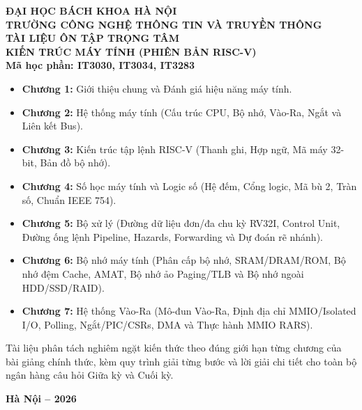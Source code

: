\documentclass[12pt,a4paper]{report}
\begin{document}
\begin{titlepage}
    \begin{center}
        \textbf{\large ĐẠI HỌC BÁCH KHOA HÀ NỘI}\\
        \textbf{\large TRƯỜNG CÔNG NGHỆ THÔNG TIN VÀ TRUYỀN THÔNG}\\[2.5cm]
        
        {\Huge \textbf{TÀI LIỆU ÔN TẬP TRỌNG TÂM}}\\[0.5cm]
        {\LARGE \textbf{KIẾN TRÚC MÁY TÍNH (PHIÊN BẢN RISC-V)}}\\[0.5cm]
        {\large \textbf{Mã học phần: IT3030, IT3034, IT3283}}\\[2cm]
        
        \begin{tcolorbox}[bwbox, title={Phạm vi và Cấu trúc tài liệu (Chương 1 -- Chương 7)}]
            \begin{itemize}
                \item \textbf{Chương 1:} Giới thiệu chung và Đánh giá hiệu năng máy tính.
                \item \textbf{Chương 2:} Hệ thống máy tính (Cấu trúc CPU, Bộ nhớ, Vào-Ra, Ngắt và Liên kết Bus).
                \item \textbf{Chương 3:} Kiến trúc tập lệnh RISC-V (Thanh ghi, Hợp ngữ, Mã máy 32-bit, Bản đồ bộ nhớ).
                \item \textbf{Chương 4:} Số học máy tính và Logic số (Hệ đếm, Cổng logic, Mã bù 2, Tràn số, Chuẩn IEEE 754).
                \item \textbf{Chương 5:} Bộ xử lý (Đường dữ liệu đơn/đa chu kỳ RV32I, Control Unit, Đường ống lệnh Pipeline, Hazards, Forwarding và Dự đoán rẽ nhánh).
                \item \textbf{Chương 6:} Bộ nhớ máy tính (Phân cấp bộ nhớ, SRAM/DRAM/ROM, Bộ nhớ đệm Cache, AMAT, Bộ nhớ ảo Paging/TLB và Bộ nhớ ngoài HDD/SSD/RAID).
                \item \textbf{Chương 7:} Hệ thống Vào-Ra (Mô-đun Vào-Ra, Định địa chỉ MMIO/Isolated I/O, Polling, Ngắt/PIC/CSRs, DMA và Thực hành MMIO RARS).
            \end{itemize}
            Tài liệu phân tách nghiêm ngặt kiến thức theo đúng giới hạn từng chương của bài giảng chính thức, kèm quy trình giải từng bước và lời giải chi tiết cho toàn bộ ngân hàng câu hỏi Giữa kỳ và Cuối kỳ.
        \end{tcolorbox}
        
        \vfill
        {\large \textbf{Hà Nội -- 2026}}
    \end{center}
\end{titlepage}

\tableofcontents
\newpage








\end{document}
